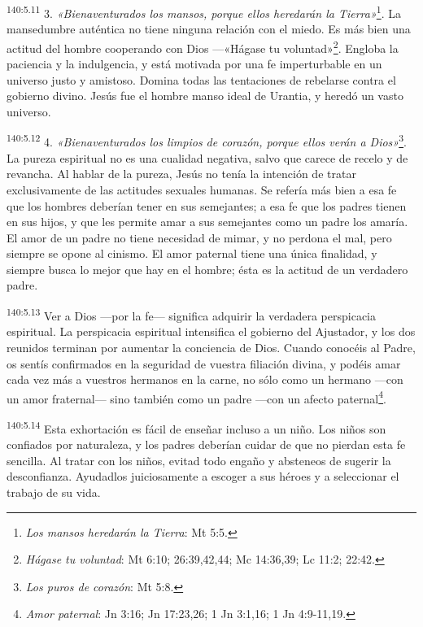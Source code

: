 \par
\textsuperscript{140:5.11} 3. \textit{«Bienaventurados los mansos, porque ellos heredarán la Tierra»}\footnote{\textit{Los mansos heredarán la Tierra}: Mt 5:5.}. La mansedumbre auténtica no tiene ninguna relación con el miedo. Es más bien una actitud del hombre cooperando con Dios ---«Hágase tu voluntad»\footnote{\textit{Hágase tu voluntad}: Mt 6:10; 26:39,42,44; Mc 14:36,39; Lc 11:2; 22:42.}. Engloba la paciencia y la indulgencia, y está motivada por una fe imperturbable en un universo justo y amistoso. Domina todas las tentaciones de rebelarse contra el gobierno divino. Jesús fue el hombre manso ideal de Urantia, y heredó un vasto universo.

\par
\textsuperscript{140:5.12} 4. \textit{«Bienaventurados los limpios de corazón, porque ellos verán a Dios»}\footnote{\textit{Los puros de corazón}: Mt 5:8.}. La pureza espiritual no es una cualidad negativa, salvo que carece de recelo y de revancha. Al hablar de la pureza, Jesús no tenía la intención de tratar exclusivamente de las actitudes sexuales humanas. Se refería más bien a esa fe que los hombres deberían tener en sus semejantes; a esa fe que los padres tienen en sus hijos, y que les permite amar a sus semejantes como un padre los amaría. El amor de un padre no tiene necesidad de mimar, y no perdona el mal, pero siempre se opone al cinismo. El amor paternal tiene una única finalidad, y siempre busca lo mejor que hay en el hombre; ésta es la actitud de un verdadero padre.

\par
\textsuperscript{140:5.13} Ver a Dios ---por la fe--- significa adquirir la verdadera perspicacia espiritual. La perspicacia espiritual intensifica el gobierno del Ajustador, y los dos reunidos terminan por aumentar la conciencia de Dios. Cuando conocéis al Padre, os sentís confirmados en la seguridad de vuestra filiación divina, y podéis amar cada vez más a vuestros hermanos en la carne, no sólo como un hermano ---con un amor fraternal--- sino también como un padre ---con un afecto paternal\footnote{\textit{Amor paternal}: Jn 3:16; Jn 17:23,26; 1 Jn 3:1,16; 1 Jn 4:9-11,19.}.

\par
\textsuperscript{140:5.14} Esta exhortación es fácil de enseñar incluso a un niño. Los niños son confiados por naturaleza, y los padres deberían cuidar de que no pierdan esta fe sencilla. Al tratar con los niños, evitad todo engaño y absteneos de sugerir la desconfianza. Ayudadlos juiciosamente a escoger a sus héroes y a seleccionar el trabajo de su vida.

